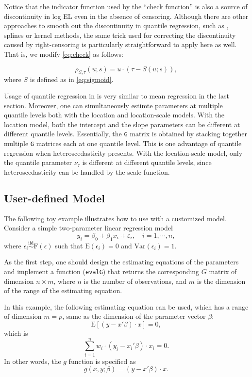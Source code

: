 \documentclass[article]{jss}
\renewcommand{\E}{\textrm{E}}
\newcommand{\e}{\varepsilon}
\newcommand{\iid}{\stackrel {\textrm{iid}}{\sim}}
\renewcommand{\|}{\,|\,}
\begin{document}
Notice that the indicator function used by the ``check function'' is also a source of discontinuity in log EL even in the absence of censoring. Although there are other approaches to smooth out the discontinuity in quantile regression, such as \citet{chen2007}, splines or kernel methods, the same trick used for correcting the discontinuity caused by right-censoring is particularly straightforward to apply here as well. That is, we modify \eqref{eq:check} as follows:

\begin{equation}
\rho_{S,\tau}(u;s) = u\cdot(\tau - S(u;s)),
\end{equation}
where \(S\) is defined as in \eqref{eq:sigmoid}.

Usage of quantile regression in  is very similar to mean regression in the last section. Moreover, one can simultaneously estimte parameters at multiple quantile levels both with the location and location-scale models. With the location model, both the intercept and the slope parameters can be different at different quantile levels. Essentially, the \texttt{G} matrix is obtained by stacking together multiple \texttt{G} matrices each at one quantile level. This is one advantage of quantile regression when heteroscedasticity presents. With the location-scale model, only the quantile parameter \(\nu_{\tau}\) is different at different quantile levels, since heteroscedasticity can be handled by the scale function.

\hypertarget{user-defined-model}{%
\subsection{User-defined Model}\label{user-defined-model}}

The following toy example illustrates how to use  with a customized model. Consider a simple two-parameter linear regression model
\[
  y_i = \beta_0 + \beta_1x_i + \e_i, \quad i=1,\cdots,n, 
\]
where \(\epsilon_i \iid \text{F}(\epsilon)\) such that \(\E(\epsilon_i) = 0\) and \(\text{Var}(\epsilon_i) = 1\).

As the first step, one should design the estimating equations of the parameters and implement a function (\texttt{evalG}) that returns the corresponding \(G\) matrix of dimension \(n\times m\), where \(n\) is the number of observations, and \(m\) is the dimension of the range of the estimating equation.

In this example, the following estimating equation can be used, which has a range of dimension \(m=p\), same as the dimension of the parameter vector \(\beta\):
\[
  \E[(y-x'\beta)\cdot x] = 0,
\]
which is
\[
  \sum_{i=1}^n w_i\cdot (y_i-x_i'\beta)\cdot x_i = 0.
\]
In other words, the \(g\) function is specified as
\[
  g(x,y;\beta) = (y-x'\beta)\cdot x.
\]
\end{document}
